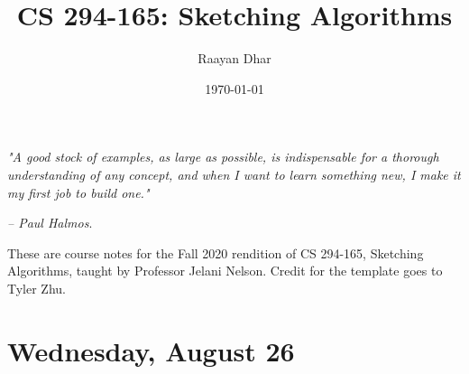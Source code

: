 \documentclass[11 pt]{scrartcl}
\begin{document}
 
\title{\Large CS 294-165: Sketching Algorithms}
\author{\large Raayan Dhar}
\date{\large\today}

\maketitle 

\begin{center}
\begin{displayquote}
    \emph{"A good stock of examples, as large as possible, is indispensable for a thorough understanding of any concept, and when I want to learn something new, I make it my first job to build one."} \\ \begin{flushright} \emph{– Paul Halmos}.  \end{flushright}
\end{displayquote}
\end{center}


These are course notes for the Fall 2020 rendition of CS 294-165, Sketching Algorithms, taught by Professor Jelani Nelson. Credit for the template goes to Tyler Zhu.

\tableofcontents 

\newpage

\section{Wednesday, August 26}
\end{document}
